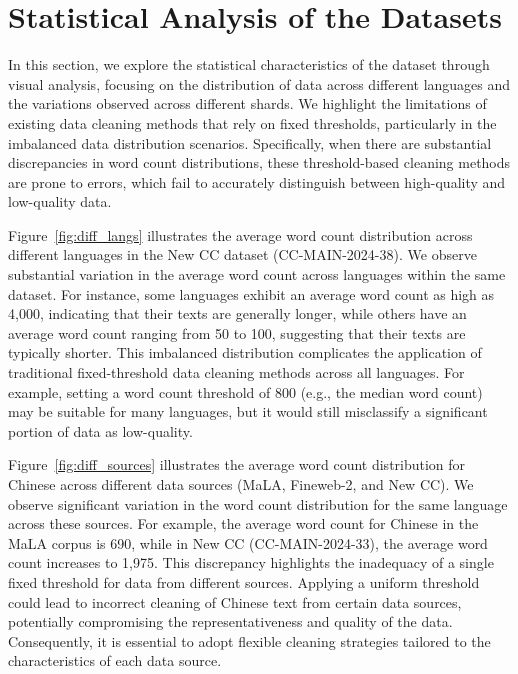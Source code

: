 

\section{Statistical Analysis of the Datasets}
\label{appex:feature_analysis}
In this section, we explore the statistical characteristics of the dataset through visual analysis, focusing on the distribution of data across different languages and the variations observed across different shards.
We highlight the limitations of existing data cleaning methods that rely on fixed thresholds, particularly in the imbalanced data distribution scenarios.
Specifically, when there are substantial discrepancies in word count distributions, these threshold-based cleaning methods are prone to errors, which fail to accurately distinguish between high-quality and low-quality data.

Figure~\ref{fig:diff_langs} illustrates the average word count distribution across different languages in the New CC dataset (CC-MAIN-2024-38).
We observe substantial variation in the average word count across languages within the same dataset.
For instance, some languages exhibit an average word count as high as 4,000, indicating that their texts are generally longer, while others have an average word count ranging from 50 to 100, suggesting that their texts are typically shorter.
This imbalanced distribution complicates the application of traditional fixed-threshold data cleaning methods across all languages.
For example, setting a word count threshold of 800 (e.g., the median word count) may be suitable for many languages, but it would still misclassify a significant portion of data as low-quality.

Figure~\ref{fig:diff_sources} illustrates the average word count distribution for Chinese across different data sources (MaLA, Fineweb-2, and New CC). We observe significant variation in the word count distribution for the same language across these sources.
For example, the average word count for Chinese in the MaLA corpus is 690, while in New CC (CC-MAIN-2024-33), the average word count increases to 1,975.
This discrepancy highlights the inadequacy of a single fixed threshold for data from different sources.
Applying a uniform threshold could lead to incorrect cleaning of Chinese text from certain data sources, potentially compromising the representativeness and quality of the data.
Consequently, it is essential to adopt flexible cleaning strategies tailored to the characteristics of each data source.


